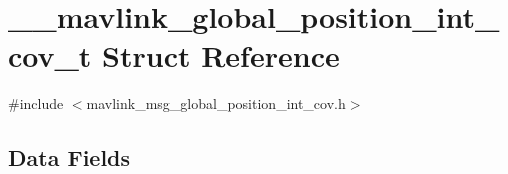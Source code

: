 \hypertarget{struct____mavlink__global__position__int__cov__t}{\section{\+\_\+\+\_\+mavlink\+\_\+global\+\_\+position\+\_\+int\+\_\+cov\+\_\+t Struct Reference}
\label{struct____mavlink__global__position__int__cov__t}
}


{\ttfamily \#include $<$mavlink\+\_\+msg\+\_\+global\+\_\+position\+\_\+int\+\_\+cov.\+h$>$}

\subsection*{Data Fields}
